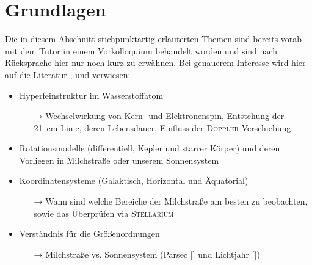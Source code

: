 \section{Grundlagen}
Die in diesem Abschnitt stichpunktartig erläuterten Themen sind bereits vorab mit dem Tutor in einem Vorkolloquium behandelt worden und sind nach Rücksprache hier nur noch kurz zu erwähnen. Bei genauerem Interesse wird hier auf die Literatur \cite{H1}, \cite{Usermanual} und \cite{AntennaResp} verwiesen:
\begin{itemize}
    \item Hyperfeinstruktur im Wasserstoffatom
    \begin{itemize}
        \item[→] Wechselwirkung von Kern- und Elektronenspin, Entstehung der \SI{21}{\centi \metre}-Linie, deren Lebensdauer, Einfluss der \textsc{Doppler}-Verschiebung
    \end{itemize}
    \item Rotationsmodelle (differentiell, Kepler und starrer Körper) und deren Vorliegen in Milchstraße oder unserem Sonnensystem
    \item Koordinatensysteme (Galaktisch, Horizontal und Äquatorial)
    \begin{itemize}
        \item[→] Wann sind welche Bereiche der Milchstraße am besten zu beobachten, sowie das Überprüfen via \textsc{Stellarium} 
    \end{itemize}
    \item Verständnis für die Größenordnungen
    \begin{itemize}
        \item[→] Milchstraße vs. Sonnensystem (Parsec [\si{\parsec}] und Lichtjahr [\si{\lightyear}])
    \end{itemize}
\end{itemize}
